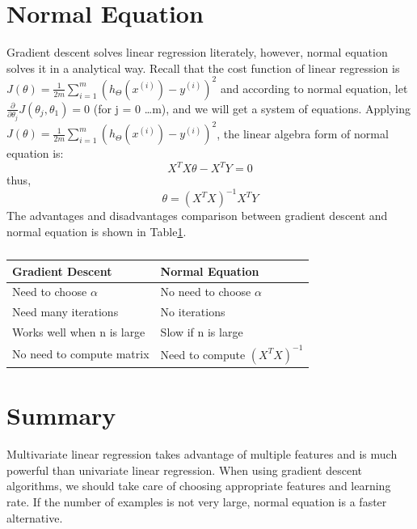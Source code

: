 \documentclass{article}
\begin{document}
\section{Normal Equation}
Gradient descent solves linear regression literately, however, normal equation solves it in a analytical way. Recall that the cost function of linear regression is $J(\theta) = \frac{1}{2m} \sum_{i=1}^{m} (h_\Theta({x^{(i)}})-y^{(i)})^2$ and according to normal equation, let $\frac{\partial}{\partial \theta_j}J(\theta_j, \theta_1) = 0$ (for j = 0 \ldots m), and we will get a system of equations. Applying $J(\theta) = \frac{1}{2m} \sum_{i=1}^{m} (h_\Theta({x^{(i)}})-y^{(i)})^2$, the linear algebra form of normal equation is:
\begin{equation}\label{normal_quation_linear_algebra form}
X^{T}X\theta - X^{T}Y = 0
\end{equation}
thus,
\begin{equation}\label{theta_expression}
\theta = (X^{T}X)^{-1}X^{T}Y
\end{equation}
The advantages and disadvantages comparison between gradient descent and normal equation is shown in Table\ref{normal_equation_comparison_with_gradient_descent}.
\begin{table}[ht]
\begin{center}
\caption{}\label{normal_equation_comparison_with_gradient_descent}
\begin{tabular}{l|l}
\hline
Gradient Descent & Normal Equation\\
\hline
Need to choose $\alpha$ & No need to choose $\alpha$\\
Need many iterations & No iterations\\
Works well when n is large & Slow if n is large\\
No need to compute matrix & Need to compute $(X^{T}X)^{-1}$\\
\hline
\end{tabular}
\end{center}
\end{table}
\section{Summary}
Multivariate linear regression takes advantage of multiple features and is much powerful than univariate linear regression. When using gradient descent algorithms, we should take care of choosing appropriate features and learning rate. If the number of examples is not very large, normal equation is a faster alternative.
\end{document}
